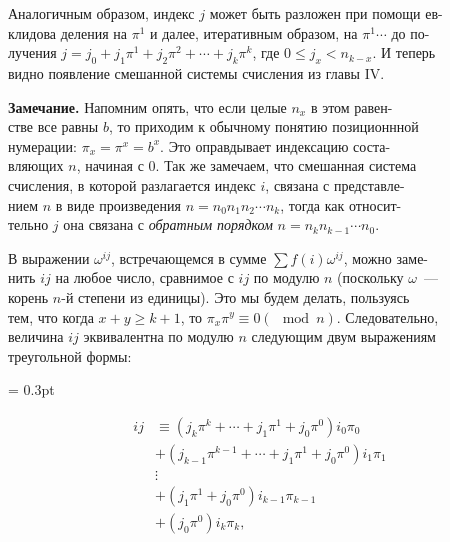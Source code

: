 \documentclass{mai_book}
\begin{document}
{\medskip
\noindent Аналогичным образом, индекс $j$ может быть разложен при помощи ев-\\клидова деления на $\pi^1$ и далее, итеративным образом, на $\pi^1 \cdots$ до по-\\лучения $j = j_0 + j_{1}\pi^1 + j_{2}\pi^2 + \cdots + j_{k}\pi^k$, где $0\leqslant j_x < n_{k-x}$. И теперь\\ видно появление смешанной системы счисления из главы IV.
\newpage


\begin{flushleft}
  \begin{small}
		\hspace{1cm} \textbf{Замечание.} Напомним опять, что если целые $n_x$ в этом равен-\\ \hspace{1cm} стве все равны $b$, то приходим к обычному понятию позиционнной \\ \hspace{1cm} нумерации: $\pi_x = \pi^x = b^x$. Это оправдывает индексацию соста-\\ \hspace{1cm} вляющих $n$, начиная с 0. Так же замечаем, что смешанная система\\  \hspace{1cm} счисления, в которой разлагается индекс $i$, связана с представле-\\ \hspace{1cm} нием $n$ в виде произведения $n={n_0}{n_1}{n_2}\cdots{n_k}$, тогда как относит-\\ \hspace{1cm} тельно $j$ она связана с \textit{обратным порядком} $n={n_k}{n_{k-1}}\cdots{n_0}$.
	\end{small}
	\end{flushleft}
\indent В выражении $\omega^{ij}$, встречающемся в сумме $\sum f(i) \omega^{ij}$, можно заме-\\нить $ij$ на любое число, сравнимое с $ij$ по модулю $n$ (поскольку $\omega$~---\\ корень $n$-й степени из единицы). Это мы будем делать, пользуясь \\ тем, что когда $x+y \geqslant k+1$, то $\pi_x\pi^y\equiv 0 (\mod n)$. Следовательно,\\ величина $ij$ эквивалентна по модулю $n$ следующим двум выражениям\\ треугольной формы:
\begin{small}
\columnseprule = 0.3pt\columnsep=24pt 
\begin{multicols}{2}
\begin{align*}
ij &\equiv (j_k\pi^k +\cdots+ j_1\pi^1+ j_0\pi^0)i_0\pi_0\\
&+(j_{k-1}\pi^{k-1} +\cdots+ j_1\pi^1+ j_0\pi^0)i_1\pi_1\\
&\vdots\\
&+ (j_1\pi^1 + j_0\pi^0)i_{k-1}\pi_{k-1}\\
&+ (j_0\pi^0)i_k\pi_k,\\
\end{align*} 


\end{multicols}
\end{small}}
\end{document}
